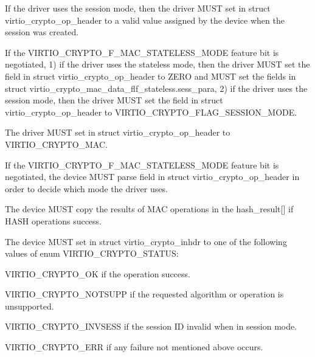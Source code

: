 \begin{itemize*}
\item If the driver uses the session mode, then the driver MUST set 
    in struct virtio_crypto_op_header to a valid value assigned by the device when the
    session was created.
\item If the VIRTIO_CRYPTO_F_MAC_STATELESS_MODE feature bit is negotiated, 1) if the
    driver uses the stateless mode, then the driver MUST set the  field
    in struct virtio_crypto_op_header to ZERO and MUST set the fields in struct
    virtio_crypto_mac_data_flf_stateless.sess_para, 2) if the driver uses the session
    mode, then the driver MUST set the  field in struct virtio_crypto_op_header
    to VIRTIO_CRYPTO_FLAG_SESSION_MODE.
\item The driver MUST set  in struct virtio_crypto_op_header to VIRTIO_CRYPTO_MAC.
\end{itemize*}


\begin{itemize*}
\item If the VIRTIO_CRYPTO_F_MAC_STATELESS_MODE feature bit is negotiated, the device
    MUST parse  field in struct virtio_crypto_op_header in order to decide
	which mode the driver uses.
\item The device MUST copy the results of MAC operations in the hash_result[] if HASH
    operations success.
\item The device MUST set  in struct virtio_crypto_inhdr to one of the
    following values of enum VIRTIO_CRYPTO_STATUS:
\begin{itemize*}
\item VIRTIO_CRYPTO_OK if the operation success.
\item VIRTIO_CRYPTO_NOTSUPP if the requested algorithm or operation is unsupported.
\item VIRTIO_CRYPTO_INVSESS if the session ID invalid when in session mode.
\item VIRTIO_CRYPTO_ERR if any failure not mentioned above occurs.
\end{itemize*}
\end{itemize*}


